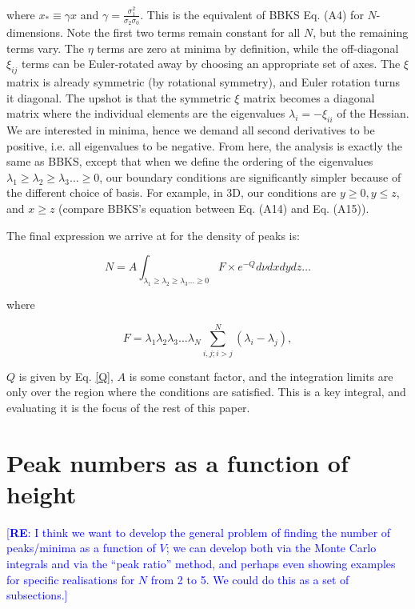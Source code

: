 \documentclass[12pt]{article}
\newcommand{\re}[1]{\textcolor{blue}{[{\bf RE}: #1]}}
\begin{document}
\noindent where $x_* \equiv \gamma x$ and $\gamma = \frac{\sigma_1^2}{\sigma_2 \sigma_0}$. This is the equivalent of BBKS Eq. (A4) for $N$-dimensions. Note the first two terms remain constant for all $N$, but the remaining terms vary. The $\eta$ terms are zero at minima by definition, while the off-diagonal $\xi_{ij}$ terms can be Euler-rotated away by choosing an appropriate set of axes. The $\xi$ matrix is already symmetric (by rotational symmetry), and Euler rotation turns it diagonal.\cite{Goldstein} The upshot is that the symmetric $\xi$ matrix becomes a diagonal matrix where the individual elements are the eigenvalues $\lambda_i = -\xi_{ii}$ of the Hessian. We are interested in minima, hence we demand all second derivatives to be positive, i.e. all eigenvalues to be negative. From here, the analysis is exactly the same as BBKS, except that when we define the ordering of the eigenvalues $\lambda_1 \geq \lambda_2 \geq \lambda_3 \ldots \geq 0$, our boundary conditions are significantly simpler because of the different choice of basis. For example, in 3D, our conditions are $y \geq 0, y \leq z$, and $x \geq z$ (compare BBKS's equation between Eq. (A14) and Eq. (A15)).

The final expression we arrive at for the density of peaks is:

\begin{equation} \label{DensityOfPeaks}
N = A \int_{\lambda_1 \geq \lambda_2 \geq \lambda_3 \ldots \geq 0} F \times e^{-Q} d\nu dx dy dz \ldots
\end{equation}

\noindent where

\begin{equation}
F = \lambda_1\lambda_2\lambda_3\ldots\lambda_N \sum^N_{i,j; i>j} (\lambda_i - \lambda_j),
\end{equation}

\noindent $Q$ is given by Eq. \ref{Q}, $A$ is some constant factor, and the integration limits are only over the region where the conditions are satisfied. This is a key integral, and evaluating it is the focus of the rest of this paper.

\section{Peak numbers as a function of height}

\re{I think we want to develop the general problem of finding the number of peaks/minima as a function of $V$; we can develop both via the Monte Carlo integrals and via the ``peak ratio'' method, and perhaps even showing examples for specific realisations for $N$ from 2 to 5.  We could do this as a set of subsections.}  
\end{document}
